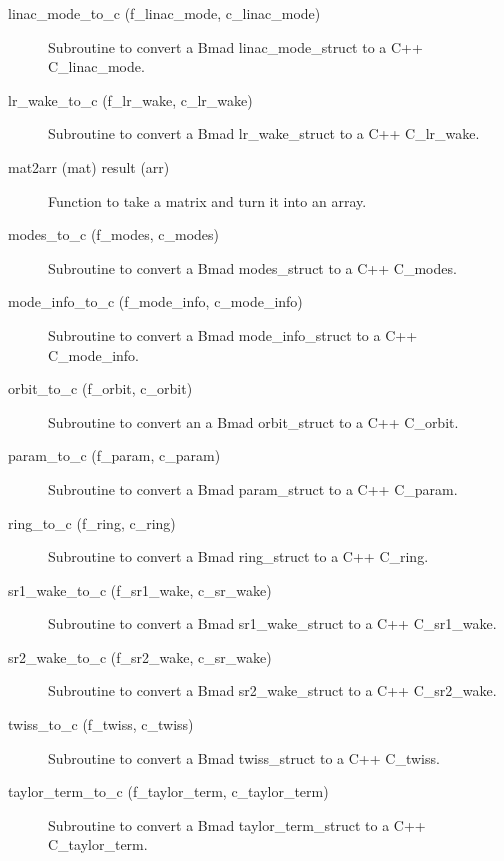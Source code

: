 \begin{description}
\item[linac\_mode\_to\_c (f\_linac\_mode, c\_linac\_mode)] \Newline 
Subroutine to convert a Bmad linac\_mode\_struct to a C++ C\_linac\_mode.

\item[lr\_wake\_to\_c (f\_lr\_wake, c\_lr\_wake)] \Newline 
Subroutine to convert a Bmad lr\_wake\_struct to a C++ C\_lr\_wake.

\item[mat2arr (mat) result (arr)] \Newline 
Function to take a matrix and turn it into an array.

\item[modes\_to\_c (f\_modes, c\_modes)] \Newline 
Subroutine to convert a Bmad modes\_struct to a C++ C\_modes.

\item[mode\_info\_to\_c (f\_mode\_info, c\_mode\_info)] \Newline 
Subroutine to convert a Bmad mode\_info\_struct to a C++ C\_mode\_info.

\item[orbit\_to\_c (f\_orbit, c\_orbit)] \Newline 
Subroutine to convert an a Bmad orbit\_struct to a C++ C\_orbit.

\item[param\_to\_c (f\_param, c\_param)] \Newline 
Subroutine to convert a Bmad param\_struct to a C++ C\_param.

\item[ring\_to\_c (f\_ring, c\_ring)] \Newline 
Subroutine to convert a Bmad ring\_struct to a C++ C\_ring.

\item[sr1\_wake\_to\_c (f\_sr1\_wake, c\_sr\_wake)] \Newline 
Subroutine to convert a Bmad sr1\_wake\_struct to a C++ C\_sr1\_wake.

\item[sr2\_wake\_to\_c (f\_sr2\_wake, c\_sr\_wake)] \Newline 
Subroutine to convert a Bmad sr2\_wake\_struct to a C++ C\_sr2\_wake.

\item[twiss\_to\_c (f\_twiss, c\_twiss)] \Newline 
Subroutine to convert a Bmad twiss\_struct to a C++ C\_twiss.

\item[taylor\_term\_to\_c (f\_taylor\_term, c\_taylor\_term)] \Newline 
Subroutine to convert a Bmad taylor\_term\_struct to a C++ C\_taylor\_term.


\end{description}
